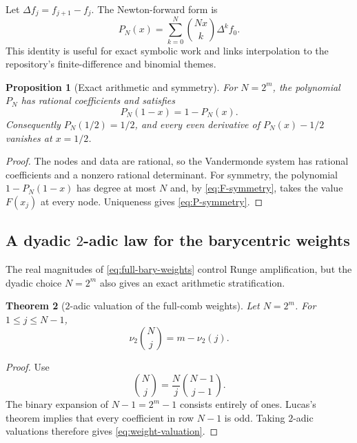 \documentclass[11pt,oneside]{article}
\newtheorem{theorem}{Theorem}[section]
\newtheorem{proposition}[theorem]{Proposition}
\theoremstyle{definition}
\theoremstyle{remark}
\begin{document}
Let $\Delta f_j=f_{j+1}-f_j$.  The Newton-forward form is
\begin{equation}
 P_N(x)=\sum_{k=0}^{N}\binom{Nx}{k}\Delta^k f_0.
 \label{eq:newton-forward}
\end{equation}
This identity is useful for exact symbolic work and links interpolation to the repository's finite-difference and binomial themes.

\begin{proposition}[Exact arithmetic and symmetry]
\label{prop:exact-symmetry}
For $N=2^m$, the polynomial $P_N$ has rational coefficients and satisfies
\begin{equation}
 P_N(1-x)=1-P_N(x).
 \label{eq:P-symmetry}
\end{equation}
Consequently $P_N(1/2)=1/2$, and every even derivative of $P_N(x)-1/2$ vanishes at $x=1/2$.
\end{proposition}

\begin{proof}
The nodes and data are rational, so the Vandermonde system has rational coefficients and a nonzero rational determinant.  For symmetry, the polynomial $1-P_N(1-x)$ has degree at most $N$ and, by \eqref{eq:F-symmetry}, takes the value $F(x_j)$ at every node.  Uniqueness gives \eqref{eq:P-symmetry}.
\end{proof}

\subsection{A dyadic $2$-adic law for the barycentric weights}

The real magnitudes of \eqref{eq:full-bary-weights} control Runge amplification, but the dyadic choice $N=2^m$ also gives an exact arithmetic stratification.

\begin{theorem}[$2$-adic valuation of the full-comb weights]
\label{thm:weight-valuation}
Let $N=2^m$.  For $1\le j\le N-1$,
\begin{equation}
 \nu_2\!\binom Nj=m-\nu_2(j).
 \label{eq:weight-valuation}
\end{equation}
\end{theorem}

\begin{proof}
Use
\[
 \binom Nj=\frac{N}{j}\binom{N-1}{j-1}.
\]
The binary expansion of $N-1=2^m-1$ consists entirely of ones.  Lucas's theorem implies that every coefficient in row $N-1$ is odd.  Taking $2$-adic valuations therefore gives \eqref{eq:weight-valuation}.
\end{proof}
\end{document}
